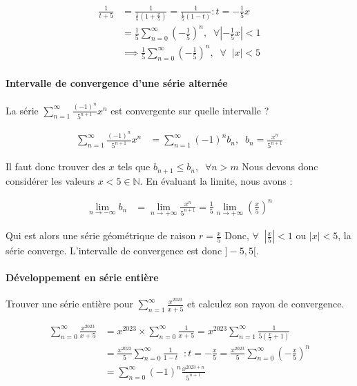 \documentclass{report}
\begin{document}
\begin{multicols*}{2}
      \begin{align*}
        \frac{1}{t+5} &= \frac{1}{\frac{1}{5}(1 + \frac{x}{5} )}  
                       = \frac{1}{\frac{1}{5}(1 - t) }  : t = -\frac{1}{5}x \\
                      &= \frac{1}{5} \sum_{n=0}^{\infty }(-\frac{1}{5})^n,
                      \;\; \forall \left|-\frac{1}{5}x \right| < 1 \\ 
                      & \implies  \frac{1}{5} \sum_{n=0}^{\infty }(-\frac{1}{5})^n
                      , \;\; \forall \;\; |x| < 5
      \end{align*}      


      \paragraph{Intervalle de convergence d'une série alternée}
      La série $\sum_{n=1}^{\infty } \frac{(-1)^n}{5^{n+1}}x^n$ est 
      convergente sur quelle intervalle ? 


      \begin{align*}
        \sum_{n=1}^{\infty } \frac{(-1)^n}{5^{n+1}}x^n 
        &= 
        \sum_{n=1}^{\infty } (-1)^nb_n, \;\; b_n = \frac{x^n}{5^{n+1}}
      \end{align*}

      Il faut donc trouver des $x$ tels que 
      $b_{n+1} \leq b_n, \;\; \forall n > m$ Nous devons donc considérer 
      les valeurs $x < 5 \in \mathbb{N}$. En évaluant la limite, nous avons :

      \begin{align*}
          \lim\limits_{n \to-\infty}b_n  &= 
          \lim\limits_{n \to+\infty }\frac{x^n}{5^{n+1}} = 
          \frac{1}{5}\lim\limits_{n \to+\infty }\left(\frac{x}{5}\right)^n  
      \end{align*}

      Qui est alors une série géométrique de raison 
      $ r = \frac{x}{5}$ Donc, 
      $\forall \;\; \left| \frac{x}{5}  \right| < 1$ ou 
      $|x| < 5$, la série converge. L'intervalle de convergence 
      est donc $] -5, 5[$. 


      \paragraph{Développement en série entière}
      Trouver une série entière pour $\sum_{n=1}^{\infty }\frac{x^{2023}}{x+5}$ 
      et calculez son rayon de convergence. 

      \begin{align*}
        \sum_{n=0}^{\infty }\frac{x^{2023}}{x+5} 
        &= 
        x^{2023} \times \sum_{n=0}^{\infty }\frac{1}{x+5} 
        = 
        x^{2023} \sum_{n=1}^{\infty } \frac{1}{5(\frac{x}{5} + 1)} \\
        &= 
        \frac{x^{2023}}{5}\sum_{n=0}^{\infty } \frac{1}{1 - t} \;\; : 
        t = - \frac{x}{5}  
        = 
       \frac{x^{2023}}{5} \sum_{n=0}^{\infty } \left( - \frac{x}{5} \right)^n \\ 
        &= \sum_{n=0}^{\infty }(-1)^n  \frac{x^{2023 + n}}{5^{n+1}} 
      \end{align*}


\end{multicols*}
\end{document}
